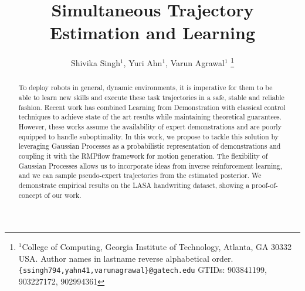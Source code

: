 \documentclass[letterpaper, 10 pt, conference]{ieeeconf}  %
\title{\LARGE \bf
    Simultaneous Trajectory Estimation and Learning
}
\author{Shivika Singh$^{1}$, Yuri Ahn$^{1}$, Varun Agrawal$^{1}$%
    \thanks{$^{1}$College of Computing, Georgia Institute of Technology, Atlanta, GA 30332 USA. Author names in lastname reverse alphabetical order.
        {\tt\small \{ssingh794,yahn41,varunagrawal\}@gatech.edu}
        GTIDs: 903841199, 903227172, 902994361}%
}
\begin{document}
    
    
    
    \maketitle
    \thispagestyle{empty}
    \pagestyle{empty}
    
    
    \begin{abstract}
    To deploy robots in general, dynamic environments, it is imperative for them to be able to learn new skills and execute these task trajectories in a safe, stable and reliable fashion. Recent work has combined Learning from Demonstration with classical control techniques to achieve state of the art results while maintaining theoretical guarantees. However, these works assume the availability of expert demonstrations and are poorly equipped to handle suboptimality. In this work, we propose to tackle this solution by leveraging Gaussian Processes as a probabilistic representation of demonstrations and coupling it with the RMPflow framework for motion generation. The flexibility of Gaussian Processes allows us to incorporate ideas from inverse reinforcement learning, and we can sample pseudo-expert trajectories from the estimated posterior. We demonstrate empirical results on the LASA handwriting dataset, showing a proof-of-concept of our work. 
    \end{abstract}
    
    
    
    
    
    
    
    
    
    
    
    \newpage
    \printbibliography
    
    
\end{document}
